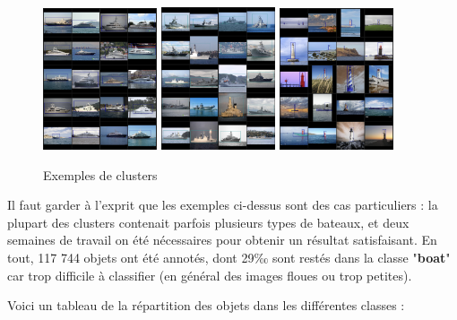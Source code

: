 \begin{figure}[H]
    \centering
    \includegraphics[width=0.3\textwidth]{./img/yachts.png}
    \includegraphics[width=0.3\textwidth]{./img/warships.png}
    \includegraphics[width=0.3\textwidth]{./img/lighthouses.png}
    \caption{Exemples de clusters}
\end{figure}

Il faut garder à l'exprit que les exemples ci-dessus sont des cas particuliers : la plupart des
clusters contenait parfois plusieurs types de bateaux, et deux semaines de travail on été nécessaires
pour obtenir un résultat satisfaisant. En tout, 117 744 objets ont été annotés, dont 29‰ sont restés
dans la classe "\textbf{boat}" car trop difficile à classifier (en général des images floues ou trop petites).

Voici un tableau de la répartition des objets dans les différentes classes : \\


